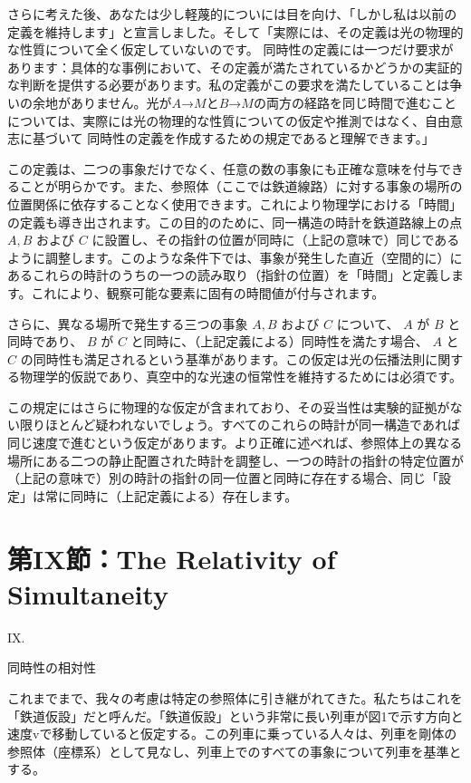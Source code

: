 \documentclass[a4paper,11pt,openany]{ltjsbook}
\begin{document}
さらに考えた後、あなたは少し軽蔑的についには目を向け、「しかし私は以前の定義を維持します」と宣言しました。そして「実際には、その定義は光の物理的な性質について全く仮定していないのです。 同時性の定義には一つだけ要求があります：具体的な事例において、その定義が満たされているかどうかの実証的な判断を提供する必要があります。私の定義がこの要求を満たしていることは争いの余地がありません。光が$A$→$M$と$B$→$M$の両方の経路を同じ時間で進むことについては、実際には光の物理的な性質についての仮定や推測ではなく、自由意志に基づいて 同時性の定義を作成するための規定であると理解できます。」

この定義は、二つの事象だけでなく、任意の数の事象にも正確な意味を付与できることが明らかです。また、参照体（ここでは鉄道線路）に対する事象の場所の位置関係に依存することなく使用できます。これにより物理学における「時間」の定義も導き出されます。この目的のために、同一構造の時計を鉄道路線上の点 $A, B$ および $C$ に設置し、その指針の位置が同時に（上記の意味で）同じであるように調整します。このような条件下では、事象が発生した直近（空間的に）にあるこれらの時計のうちの一つの読み取り（指針の位置）を「時間」と定義します。これにより、観察可能な要素に固有の時間値が付与されます。

さらに、異なる場所で発生する三つの事象 $A, B$ および $C$ について、 $A$ が $B$ と同時であり、 $B$ が $C$ と同時に、（上記定義による）同時性を満たす場合、 $A$ と $C$ の同時性も満足されるという基準があります。この仮定は光の伝播法則に関する物理学的仮説であり、真空中的な光速の恒常性を維持するためには必須です。

この規定にはさらに物理的な仮定が含まれており、その妥当性は実験的証拠がない限りほとんど疑われないでしょう。すべてのこれらの時計が同一構造であれば同じ速度で進むという仮定があります。より正確に述べれば、参照体上の異なる場所にある二つの静止配置された時計を調整し、一つの時計の指針の特定位置が（上記の意味で）別の時計の指針の同一位置と同時に存在する場合、同じ「設定」は常に同時に（上記定義による）存在します。


\clearpage
\chapter{第IX節：The Relativity of Simultaneity}

IX.

同時性の相対性

これまでまで、我々の考慮は特定の参照体に引き継がれてきた。私たちはこれを「鉄道仮設」だと呼んだ。「鉄道仮設」という非常に長い列車が図1で示す方向と速度vで移動していると仮定する。この列車に乗っている人々は、列車を剛体の参照体（座標系）として見なし、列車上でのすべての事象について列車を基準とする。
\end{document}
